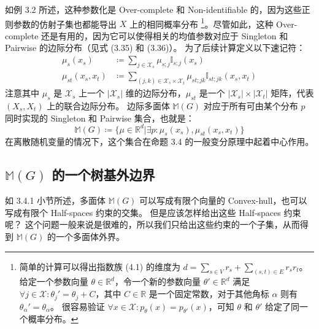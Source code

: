 如例 3.2 所述，这种参数化是 Over-complete 和 Non-identifiable 的，因为这些正则参数的仿射子集也都能导出 $X$ 上的相同概率分布 \footnote{
    简单的计算可以得出指数族 (4.1) 的维度为 $d = \sum_{s \in V}r_s + \sum_{(s, t) \in E}r_sr_t$。
    给定一个参数向量 $\theta \in \mathbb{R}^d$，令一个新的参数向量 $\theta' \in \mathbb{R}^d$ 满足 $\forall j \in \mathcal{X}: \theta_j' = \theta_j + C$，其中 $C \in \mathbb{R}$ 是一个固定常数，对于其他角标 $\alpha$ 则有 $\theta_{\alpha}' = \theta_{\alpha}$。
    很容易验证 $\forall x \in \mathcal{X}: p_{\theta}(x) = p_{\theta'}(x)$，可知 $\theta$ 和 $\theta'$ 给定了同一个概率分布。
}。尽管如此，这种 Over-complete 还是有用的，因为它可以使得相关的均值参数对应于 Singleton 和 Pairwise 的边际分布（见式 (3.35) 和 (3.36)）。
为了后续计算定义以下速记符：
\begin{subequations}
\begin{align}
    \mu_s(x_s) &\coloneqq \sum_{j \in \mathcal{X}_s}\mu_{s;j}\mathbb{I}_{s;j}(x_s) \\
    \mu_{st}(x_s, x_t) &\coloneqq \sum_{(j, k) \in \mathcal{X}_s \times \mathcal{X}_t} \mu_{st;jk}\mathbb{I}_{st;jk}(x_s, x_t)
\end{align}
\end{subequations}
注意其中 $\mu_s$ 是 $\mathcal{X}_s$ 上一个 $|\mathcal{X}_s|$ 维的边际分布，$\mu_{st}$ 是一个 $|\mathcal{X}_s| \times |\mathcal{X}_t|$ 矩阵，代表 $(X_s, X_t)$ 上的联合边际分布。
边际多面体 $\mathbb{M}(G)$ 对应于所有可由某个分布 $p$ 同时实现的 Singleton 和 Pairwise 集合，也就是：
\begin{equation}
    \mathbb{M}(G) \coloneqq \{\mu \in \mathbb{R}^d| \exists p: \mu_s(x_s), \mu_{st}(x_s, x_t)\}
\end{equation}
在离散随机变量的情况下，这个集合在命题 3.4 的一般变分原理中起着中心作用。

\subsection{$\mathbb{M}(G)$ 的一个树基外边界}

如 3.4.1 小节所述，多面体 $\mathbb{M}(G)$ 可以写成有限个向量的 Convex-hull，也可以写成有限个 Half-spaces 约束的交集。
但是应该怎样给出这些 Half-spaces 约束呢？
这个问题一般来说是很难的，所以我们只给出这些约束的一个子集，从而得到 $\mathbb{M}(G)$ 的一个多面体外界。

